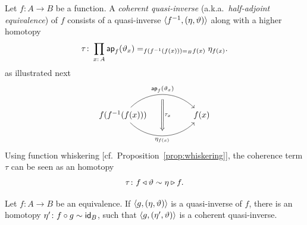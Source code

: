 \begin{defn}\label{defn:half-adjoint-equivalence}
    Let\/ $f\colon A\to B$ be a function. A \emph{coherent quasi-inverse} (a.k.a.~\textsl{half-adjoint equivalence}) of\/ $f$ consists of a quasi-inverse\/ $\langle f^{-1},(\eta,\vartheta)\rangle$ along with a higher homotopy
    \[
        \tau\colon\prod_{x\colon A}
            \fun{ap}_f(\vartheta_x)\eq{f(f^{-1}(f(x)))
                \eq Bf(x)}\eta_{f(x)}.
    \]
    as illustrated next
    \[
        \begin{tikzcd}[column sep=huge]
            f(f^{-1}(f(x)))
                    \arrow[r,
                        bend left=45,
                        "\fun{ap}_f(\vartheta_x)"{name=U,above}]
                    \arrow[r,
                        bend right=45,
                        "\eta_{f(x)}"{name=D,below}]
            &f(x)
                    \arrow[Rightarrow,
                        from=U,to=D,
                        "\tau_x",
                        shorten <=6pt,
                        shorten >=6pt]
        \end{tikzcd}
    \]
    Using function whiskering [cf.~Proposition~\ref{prop:whiskering}], the coherence term $\tau$ can be seen as an homotopy
    \[
        \tau\colon f\lwct\vartheta\sim\eta\rwct f.
    \]
\end{defn}

\begin{thm}\label{thm:coherent-quasi-inverse}
    Let\/ $f\colon A\to B$ be an equivalence. If $\langle g,(\eta,\vartheta)\rangle$ is a quasi-inverse of $f$, there is an homotopy $\eta'\colon f\circ g\sim\id_B$, such that $\langle g,(\eta',\vartheta)\rangle$ is a coherent quasi-inverse.
\end{thm}

